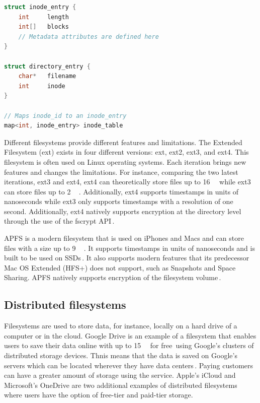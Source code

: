 \begin{minipage}{\linewidth}
\begin{lstlisting}[language=c, caption={Pseudocode of a minimalistic inode filesystem structure}, label=lst:inode_fs]
struct inode_entry {
	int 	length
	int[]	blocks
	// Metadata attributes are defined here
}

struct directory_entry {
	char*   filename
	int     inode
}

// Maps inode_id to an inode_entry
map<int, inode_entry> inode_table

\end{lstlisting}
\end{minipage}

Different filesystems provide different features and limitations. The Extended Filesystem (ext) exists in four different versions: ext, ext2, ext3, and ext4. This filesystem is often used on Linux operating systems. Each iteration brings new features and changes the limitations. For instance, comparing the two latest iterations, ext3 and ext4, ext4 can theoretically store files up to \SI{16}{\tebi\byte} while ext3 can store files up to \SI{2}{\tebi\byte}\,\cite{salterUnderstandingLinuxFilesystems2018}. Additionally, ext4 supports timestamps in units of nanoseconds while ext3 only supports timestamps with a resolution of one second. Additionally, ext4 natively supports encryption at the directory level through the use of the fscrypt \gls{API}\,\cite{FscryptArchWiki}.

\gls{APFS} is a modern filesystem that is used on iPhones and Macs and can store files with a size up to \SI{9}{\exa\byte}\,\cite{igotofferAPFSAppleFile2017}. It supports timestamps in units of nanoseconds and is built to be used on \glspl{SSD}\,\cite{nelsonWhatAPFSDoes}. It also supports modern features that its predecessor Mac OS Extended (HFS+) does not support, such as Snapshots and Space Sharing. \gls{APFS} natively supports encryption of the filesystem volume\,\cite{appleinc.FileSystemFormats}.

\subsection{Distributed filesystems}
\label{sec:distributedFSintroducction}
Filesystems are used to store data, for instance, locally on a hard drive of a computer or in the cloud. Google Drive is an example of a filesystem that enables users to save their data online with up to \SI{15}{\giga\byte} for free\,\cite{CloudStorageWork} using Google's clusters of distributed storage devices. Thnis means that the data is saved on Google's servers which can be located wherever they have data centers\,\cite{DistributedStorageWhat}. Paying customers can have a greater amount of storage using the service. Apple's iCloud and Microsoft's OneDrive are two additional examples of distributed filesystems where users have the option of \mbox{free-tier} and \mbox{paid-tier} storage.


